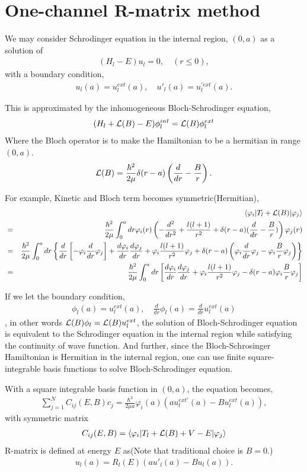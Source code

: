 \documentclass[11pt]{book}
\def\la{\langle}
\def\ra{\rangle}
\newcommand{\bea}{\begin{eqnarray}}
\newcommand{\eea}{\end{eqnarray}}
\newcommand{\no}{\nonumber \\}
\begin{document}
\section{One-channel R-matrix method} 
We may consider Schrodinger equation in the internal region, $(0,a)$ as a solution of
\bea 
(H_l-E)u_l=0,\quad (r\leq 0),
\eea 
with a boundary condition,
\bea 
u_l(a)=u_{l}^{ext}(a),\quad u'_l(a)=u_{l}^{'ext}(a).
\eea 

This is approximated by the 
inhomogeneous Bloch-Schrodinger equation,
\bea 
(H_l+{\cal L}(B)-E)\phi_l^{int}={\cal L}(B)\phi_l^{ext}
\eea 
Where the Bloch operator is to make the Hamiltonian to be a hermitian in range $(0,a)$.
\bea 
{\cal L}(B)=\frac{\hbar^2}{2\mu}\delta(r-a)\left(\frac{d}{dr}-\frac{B}{r}\right).
\eea 

For example, Kinetic and Bloch term becomes symmetric(Hermitian),
\bea 
& &\la \varphi_i|T_l+{\cal L}(B)|\varphi_j\ra \no 
&=&  \frac{\hbar^2}{2\mu}  \int_0^a dr \varphi_i(r)\left( -\frac{d^2}{dr^2}+\frac{l(l+1)}{r^2}
+\delta(r-a)(\frac{d}{dr}-\frac{B}{r}) \right) \varphi_j(r) \no 
&=&  \frac{\hbar^2}{2\mu}  \int_0^a dr \left\{
\frac{d}{dr}\left[-\varphi_i\frac{d}{dr}\varphi_j \right]
+\frac{d\varphi_i}{dr} \frac{d\varphi_j}{dr}
+\varphi_i \frac{l(l+1)}{r^2}\varphi_j 
+\delta(r-a)\left( \varphi_i\frac{d}{dr}\varphi_j-\varphi_i\frac{B}{r}\varphi_j \right) 
\right\}   \no 
&=&    \frac{\hbar^2}{2\mu}  \int_0^a dr \left[      \frac{d\varphi_i}{dr} \frac{d\varphi_j}{dr}
+\varphi_i \frac{l(l+1)}{r^2}\varphi_j 
-\delta(r-a)\varphi_i\frac{B}{r}\varphi_j   \right]     
\eea 

If we let the boundary condition,
\bea 
\phi_l(a)=u^{ext}_l(a),\quad \frac{d}{dr}\phi_l(a)=\frac{d}{dr}u^{ext}_l(a)
\eea  
, in other words ${\cal L}(B)\phi_l={\cal L}(B)u_l^{ext}$,
the solution of Bloch-Schrodinger equation is equivalent to the 
Schrodinger equation in the internal region while satisfying the
continuity of wave function. And further, since 
the Bloch-Schrosinger Hamiltonian
is Hermitian in the internal region, one can use finite square-integrable basis  
functions to solve Bloch-Schrodinger equation. 

With a square integrable basis function in $(0,a)$,
the equation becomes,
\bea 
\sum_{j=1}^N C_{ij}(E,B) c_j =\frac{\hbar^2}{2\mu a} \varphi_i(a)(a u^{ext'}_l(a)-B u^{ext}_l(a)),
\eea 
with symmetric matrix 
\bea 
\label{eq:RmatrixCij}
C_{ij}(E,B)=\la \varphi_i| T_l+{\cal L}(B)+V-E|\varphi_j\ra 
\eea 
R-matrix is defined at energy $E$ as(Note that traditional choice is $B=0$.)
\bea 
u_l(a)=R_l(E)(a u'_l(a)-B u_l(a)).
\eea 
\end{document}
